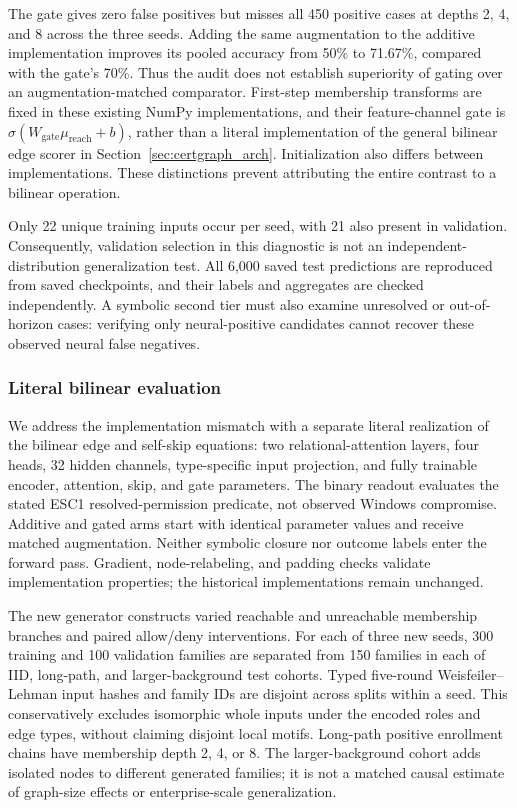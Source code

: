 

The gate gives zero false positives but misses all 450 positive cases at depths 2, 4, and 8 across the three seeds. Adding the same augmentation to the additive implementation improves its pooled accuracy from 50\% to 71.67\%, compared with the gate's 70\%. Thus the audit does not establish superiority of gating over an augmentation-matched comparator. First-step membership transforms are fixed in these existing NumPy implementations, and their feature-channel gate is $\sigma(W_{\mathrm{gate}}\mu_{\mathrm{reach}}+b)$, rather than a literal implementation of the general bilinear edge scorer in Section~\ref{sec:certgraph_arch}. Initialization also differs between implementations. These distinctions prevent attributing the entire contrast to a bilinear operation.

Only 22 unique training inputs occur per seed, with 21 also present in validation. Consequently, validation selection in this diagnostic is not an independent-distribution generalization test. All 6,000 saved test predictions are reproduced from saved checkpoints, and their labels and aggregates are checked independently. A symbolic second tier must also examine unresolved or out-of-horizon cases: verifying only neural-positive candidates cannot recover these observed neural false negatives.

\subsubsection{Literal bilinear evaluation}
We address the implementation mismatch with a separate literal realization of the bilinear edge and self-skip equations: two relational-attention layers, four heads, 32 hidden channels, type-specific input projection, and fully trainable encoder, attention, skip, and gate parameters. The binary readout evaluates the stated ESC1 resolved-permission predicate, not observed Windows compromise. Additive and gated arms start with identical parameter values and receive matched augmentation. Neither symbolic closure nor outcome labels enter the forward pass. Gradient, node-relabeling, and padding checks validate implementation properties; the historical implementations remain unchanged.

The new generator constructs varied reachable and unreachable membership branches and paired allow/deny interventions. For each of three new seeds, 300 training and 100 validation families are separated from 150 families in each of IID, long-path, and larger-background test cohorts. Typed five-round Weisfeiler--Lehman input hashes and family IDs are disjoint across splits within a seed. This conservatively excludes isomorphic whole inputs under the encoded roles and edge types, without claiming disjoint local motifs. Long-path positive enrollment chains have membership depth 2, 4, or 8. The larger-background cohort adds isolated nodes to different generated families; it is not a matched causal estimate of graph-size effects or enterprise-scale generalization.

